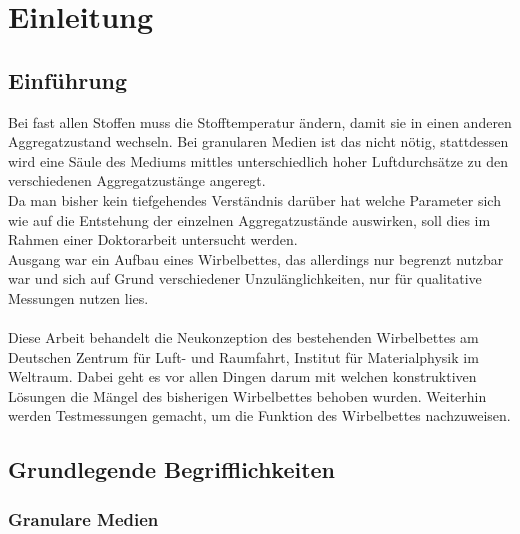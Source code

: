 \chapter{Einleitung}


\section{Einführung}

Bei fast allen Stoffen muss die Stofftemperatur ändern, damit sie in einen anderen Aggregatzustand wechseln. Bei granularen Medien ist das nicht nötig, stattdessen wird eine Säule des Mediums mittles unterschiedlich hoher Luftdurchsätze zu den verschiedenen Aggregatzustänge angeregt. \\
Da man bisher kein tiefgehendes Verständnis darüber hat welche Parameter sich wie auf die Entstehung der einzelnen Aggregatzustände auswirken, soll dies im Rahmen einer Doktorarbeit untersucht werden. \\
Ausgang war ein Aufbau eines Wirbelbettes, das allerdings nur begrenzt nutzbar war und sich auf Grund verschiedener Unzulänglichkeiten, nur für qualitative Messungen nutzen lies. \\
\hfill \\
Diese Arbeit behandelt die Neukonzeption des bestehenden Wirbelbettes am Deutschen Zentrum für Luft- und Raumfahrt, Institut für Materialphysik im Weltraum. Dabei geht es vor allen Dingen darum mit welchen konstruktiven Lösungen die Mängel des bisherigen Wirbelbettes behoben wurden. Weiterhin werden Testmessungen gemacht, um die Funktion des Wirbelbettes nachzuweisen.


\section{Grundlegende Begrifflichkeiten}

\subsection{Granulare Medien}

